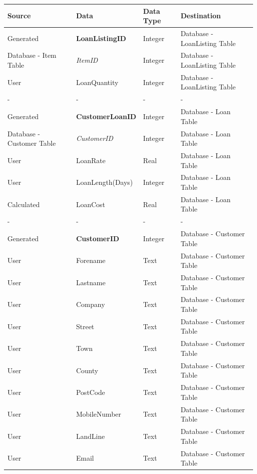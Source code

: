\begin{center}
        \begin{tabular}{|p{2cm}|p{3cm}|p{3cm}|p{3cm}|}
            \hline
            \textbf{Source} & \textbf{Data} & \textbf{Data Type} & \textbf{Destination} \\ \hline
            Generated & \textbf{LoanListingID} & Integer & Database - LoanListing Table \\ \hline
            Database - Item Table & \emph{ItemID} & Integer & Database - LoanListing Table \\ \hline
            User & LoanQuantity & Integer & Database - LoanListing Table \\ \hline
            - & - & - & - \\ \hline
            Generated & \textbf{CustomerLoanID} & Integer & Database - Loan Table \\ \hline
            Database - Customer Table & \emph{CustomerID} & Integer & Database - Loan Table \\ \hline
            User & LoanRate & Real & Database - Loan Table \\ \hline
            User & LoanLength(Days) & Integer & Database - Loan Table \\ \hline
            Calculated & LoanCost & Real & Database - Loan Table \\ \hline
            - & - & - & - \\ \hline
            Generated & \textbf{CustomerID} & Integer & Database - Customer Table \\ \hline
            User & Forename & Text & Database - Customer Table \\ \hline
            User & Lastname & Text & Database - Customer Table \\ \hline
            User & Company & Text & Database - Customer Table \\ \hline
            User & Street & Text & Database - Customer Table \\ \hline
            User & Town & Text & Database - Customer Table \\ \hline
            User & County & Text & Database - Customer Table \\ \hline
            User & PostCode & Text & Database - Customer Table \\ \hline
            User & MobileNumber & Text & Database - Customer Table \\ \hline
            User & LandLine & Text & Database - Customer Table \\ \hline
            User & Email & Text & Database - Customer Table \\ \hline
            \end{tabular}
\end{center}

